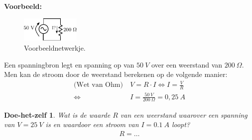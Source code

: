 \documentclass{article}
\newtheorem{DIY}{Doe-het-zelf}
\begin{document}
			\textbf{Voorbeeld:}
			\begin{figure}[h!]
				\centering
				\includegraphics[width=0.25\textwidth]{vbweerstand.pdf}
				\caption{Voorbeeldnetwerkje.}
				\label{fig:vbweerstand}
			\end{figure}

			Een spanningbron legt en spanning op van $50~V$ over een weerstand van $200~\Omega$. Men kan de stroom door de weerstand berekenen op de volgende manier:
			\begin{align}
				\text{(Wet van Ohm)}~&V = R\cdot I \Leftrightarrow I = \frac{V}{R} \\ \Leftrightarrow~&I = \frac{50~V}{200~\Omega}= 0,25~A
			\end{align}

			\begin{DIY} Wat is de waarde $R$ van een weerstand waarover een spanning van $V = 25~V$ is en waardoor een stroom van $I = 0.1~A$ loopt?
			\begin{align}
			    R = \ldots
			\end{align}
			\end{DIY}
\end{document}
